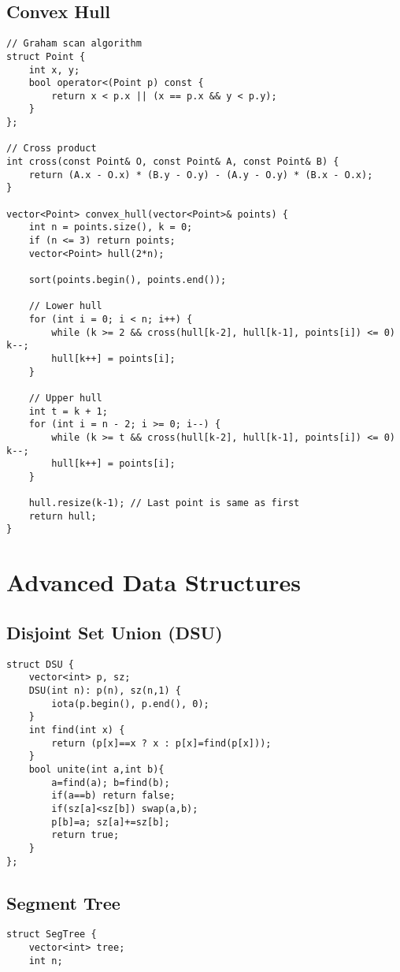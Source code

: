 \documentclass[10pt]{article}
\begin{document}
\begin{landscape}
\begin{multicols}{2}
\subsection{Convex Hull}
\begin{lstlisting}[style=cpp]
// Graham scan algorithm
struct Point {
    int x, y;
    bool operator<(Point p) const {
        return x < p.x || (x == p.x && y < p.y);
    }
};

// Cross product
int cross(const Point& O, const Point& A, const Point& B) {
    return (A.x - O.x) * (B.y - O.y) - (A.y - O.y) * (B.x - O.x);
}

vector<Point> convex_hull(vector<Point>& points) {
    int n = points.size(), k = 0;
    if (n <= 3) return points;
    vector<Point> hull(2*n);
    
    sort(points.begin(), points.end());
    
    // Lower hull
    for (int i = 0; i < n; i++) {
        while (k >= 2 && cross(hull[k-2], hull[k-1], points[i]) <= 0) k--;
        hull[k++] = points[i];
    }
    
    // Upper hull
    int t = k + 1;
    for (int i = n - 2; i >= 0; i--) {
        while (k >= t && cross(hull[k-2], hull[k-1], points[i]) <= 0) k--;
        hull[k++] = points[i];
    }
    
    hull.resize(k-1); // Last point is same as first
    return hull;
}
\end{lstlisting}

\section{Advanced Data Structures}
\subsection{Disjoint Set Union (DSU)}
\begin{lstlisting}[style=cpp]
struct DSU {
    vector<int> p, sz;
    DSU(int n): p(n), sz(n,1) {
        iota(p.begin(), p.end(), 0);
    }
    int find(int x) {
        return (p[x]==x ? x : p[x]=find(p[x]));
    }
    bool unite(int a,int b){
        a=find(a); b=find(b);
        if(a==b) return false;
        if(sz[a]<sz[b]) swap(a,b);
        p[b]=a; sz[a]+=sz[b];
        return true;
    }
};
\end{lstlisting}

\subsection{Segment Tree}
\begin{lstlisting}[style=cpp]
struct SegTree {
    vector<int> tree;
    int n;
    

\end{lstlisting}
\end{multicols}
\end{landscape}
\end{document}
